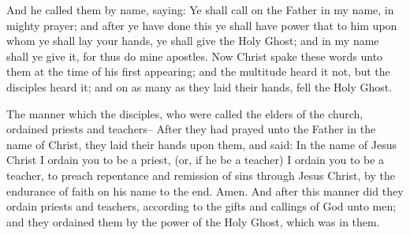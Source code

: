 \bverse \iffalse And he called them by name, saying: Ye shall call on the Father in my name, in mighty prayer; and after ye have done this ye shall have power that to him upon whom ye shall lay your hands, ye shall give the Holy Ghost; and in my name shall ye give it, for thus do mine apostles. \fi
And he called them by name, saying: Ye shall call on the Father in my name, in mighty prayer; and after ye have done this ye shall have power that to him upon whom ye shall lay your hands, ye shall give the Holy Ghost; and in my name shall ye give it, for thus do mine apostles.
\bverse \iffalse Now Christ spake these words unto them at the time of his first appearing; and the multitude heard it not, but the disciples heard it; and on as many as they laid their hands, fell the Holy Ghost. \fi
Now Christ spake these words unto them at the time of his first appearing; and the multitude heard it not, but the disciples heard it; and on as many as they laid their hands, fell the Holy Ghost.

\bchapter
\bverse \iffalse The manner which the disciples, who were called the elders of the church, ordained priests and teachers-- \fi
The manner which the disciples, who were called the elders of the church, ordained priests and teachers--
\bverse \iffalse After they had prayed unto the Father in the name of Christ, they laid their hands upon them, and said: \fi
After they had prayed unto the Father in the name of Christ, they laid their hands upon them, and said:
\bverse \iffalse In the name of Jesus Christ I ordain you to be a priest, (or, if he be a teacher) I ordain you to be a teacher, to preach repentance and remission of sins through Jesus Christ, by the endurance of faith on his name to the end. Amen. \fi
In the name of Jesus Christ I ordain you to be a priest, (or, if he be a teacher) I ordain you to be a teacher, to preach repentance and remission of sins through Jesus Christ, by the endurance of faith on his name to the end. Amen.
\bverse \iffalse And after this manner did they ordain priests and teachers, according to the gifts and callings of God unto men; and they ordained them by the power of the Holy Ghost, which was in them. \fi
And after this manner did they ordain priests and teachers, according to the gifts and callings of God unto men; and they ordained them by the power of the Holy Ghost, which was in them.

